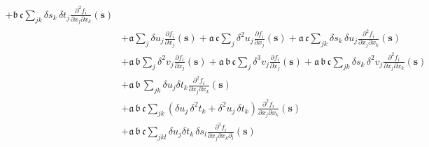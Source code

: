 \begin{align*}
+ \mathfrak{b} \, \mathfrak{c} \sum_{jk} \delta s_{k} \, \delta t_{j} 
\frac{ \partial^{2} f_{i} }{ \partial x_{j} \partial x_{k} } \! \left( \mathbf{s} \right)
\\
&+ 
\mathfrak{a} \sum_{j} \delta u_{j} \frac{ \partial f_{i} }{ \partial x_{j} } \! \left( \mathbf{s} \right)
+ \mathfrak{a} \, \mathfrak{c} \sum_{j} \delta^{2} u_{j} 
\frac{ \partial f_{i} }{ \partial x_{j} } \! \left( \mathbf{s} \right) 
+ \mathfrak{a} \, \mathfrak{c} \sum_{jk} \delta s_{k} \, \delta u_{j} 
\frac{ \partial^{2} f_{i} }{ \partial x_{j} \partial x_{k} } \! \left( \mathbf{s} \right)
\\
&+ 
\mathfrak{a} \, \mathfrak{b} \sum_{j} \delta^{2} v_{j} 
\frac{ \partial f_{i} }{ \partial x_{j} } \! \left( \mathbf{s} \right)
+ \mathfrak{a} \, \mathfrak{b} \, \mathfrak{c} \sum_{j} \delta^{3} v_{j} 
\frac{ \partial f_{i} }{ \partial x_{j} } \! \left( \mathbf{s} \right) 
+ \mathfrak{a} \, \mathfrak{b} \, \mathfrak{c} \sum_{jk} \delta s_{k} \, \delta^{2} v_{j} 
\frac{ \partial^{2} f_{i} }{ \partial x_{j} \partial x_{k} } \! \left( \mathbf{s} \right)
\\
&+ 
\mathfrak{a} \, \mathfrak{b} \, \sum_{jk} 
\delta u_{j} \delta t_{k} \frac{ \partial^{2} f_{i} }{ \partial x_{j} \partial x_{k} } \! \left( \mathbf{s} \right)
\\
&+ \mathfrak{a} \, \mathfrak{b} \, \mathfrak{c} \sum_{jk}
\left( \delta u_{j} \, \delta^{2} t_{k} + \delta^{2} u_{j} \, \delta t_{k}  \right)
\frac{ \partial^{2} f_{i} }{ \partial x_{j} \partial x_{k} } \! \left( \mathbf{s} \right) 
\\
&+
\mathfrak{a} \, \mathfrak{b} \, \mathfrak{c} \sum_{jkl}
\delta u_{j} \delta t_{k} \, \delta s_{l} 
\frac{ \partial^{3} f_{i} }{ \partial x_{j} \partial x_{k} \partial_{l} } \! \left( \mathbf{s} \right)
\\
%
\end{align*}

